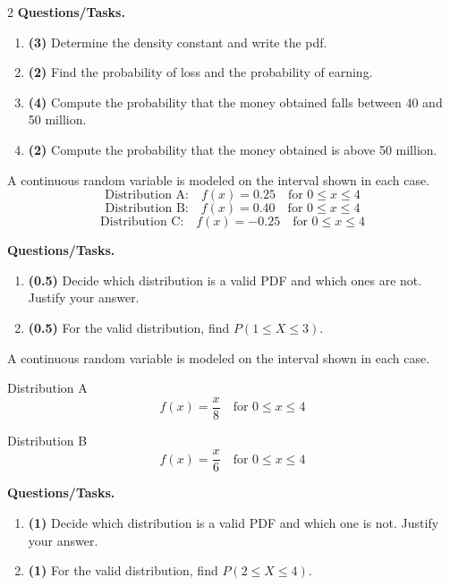 \begin{multicols}{2}
		\textbf{Questions/Tasks.}
		\begin{enumerate}[label=\textbf{\alph*)}]
			\item \textbf{(3)} Determine the density constant and write the pdf.
			\item \textbf{(2)} Find the probability of loss and the probability of earning.
			\item \textbf{(4)} Compute the probability that the money obtained falls between 40 and 50 million.
			\item \textbf{(2)} Compute the probability that the money obtained is above 50 million.
		\end{enumerate}
		
		\vspace{0.25cm}
		\vspace{-0.3cm}
		A continuous random variable is modeled on the interval shown in each case.
		\[
		\text{Distribution A:} \quad f(x)=0.25\quad\text{for }0\le x\le 4
		\]
		\[
		\text{Distribution B:} \quad f(x)=0.40\quad\text{for }0\le x\le 4
		\]
		\[
		\text{Distribution C:} \quad f(x)=-0.25\quad\text{for }0\le x\le 4
		\]
		
		\textbf{Questions/Tasks.}
		\begin{enumerate}[label=\textbf{\alph*)}]
			\item \textbf{(0.5)} Decide which distribution is a valid PDF and which ones are not. Justify your answer.
			\item \textbf{(0.5)} For the valid distribution, find $P(1\le X\le 3)$.
		\end{enumerate}
		
		\vspace{0.25cm}
		\vspace{-0.3cm}
		A continuous random variable is modeled on the interval shown in each case.
		
		Distribution A
		\[
		f(x)=\frac{x}{8}\quad\text{for }0\le x\le 4
		\]
		
		Distribution B
		\[
		f(x)=\frac{x}{6}\quad\text{for }0\le x\le 4
		\]
		
		\textbf{Questions/Tasks.}
		\begin{enumerate}[label=\textbf{\alph*)}]
			\item \textbf{(1)} Decide which distribution is a valid PDF and which one is not. Justify your answer.
			\item \textbf{(1)} For the valid distribution, find $P(2\le X\le 4)$.
		\end{enumerate}
		

\end{multicols}
